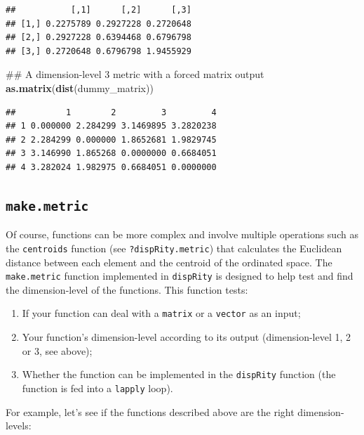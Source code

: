\documentclass[]{book}
\newenvironment{Shaded}{\begin{snugshade}}{\end{snugshade}}
\newcommand{\KeywordTok}[1]{\textcolor[rgb]{0.13,0.29,0.53}{\textbf{#1}}}
\newcommand{\NormalTok}[1]{#1}
\providecommand{\tightlist}{%
  \setlength{\itemsep}{0pt}\setlength{\parskip}{0pt}}
\theoremstyle{definition}
\theoremstyle{definition}
\theoremstyle{definition}
\theoremstyle{remark}
\begin{document}
\begin{verbatim}
##           [,1]      [,2]      [,3]
## [1,] 0.2275789 0.2927228 0.2720648
## [2,] 0.2927228 0.6394468 0.6796798
## [3,] 0.2720648 0.6796798 1.9455929
\end{verbatim}

\begin{Shaded}
\begin{Highlighting}[]
\NormalTok{## A dimension-level 3 metric with a forced matrix output}
\KeywordTok{as.matrix}\NormalTok{(}\KeywordTok{dist}\NormalTok{(dummy_matrix))}
\end{Highlighting}
\end{Shaded}

\begin{verbatim}
##          1        2         3         4
## 1 0.000000 2.284299 3.1469895 3.2820238
## 2 2.284299 0.000000 1.8652681 1.9829745
## 3 3.146990 1.865268 0.0000000 0.6684051
## 4 3.282024 1.982975 0.6684051 0.0000000
\end{verbatim}

\subsection{\texorpdfstring{\texttt{make.metric}}{make.metric}}\label{make.metric}

Of course, functions can be more complex and involve multiple operations
such as the \texttt{centroids} function (see \texttt{?dispRity.metric})
that calculates the Euclidean distance between each element and the
centroid of the ordinated space. The \texttt{make.metric} function
implemented in \texttt{dispRity} is designed to help test and find the
dimension-level of the functions. This function tests:

\begin{enumerate}
\def\labelenumi{\arabic{enumi}.}
\tightlist
\item
  If your function can deal with a \texttt{matrix} or a \texttt{vector}
  as an input;
\item
  Your function's dimension-level according to its output
  (dimension-level 1, 2 or 3, see above);
\item
  Whether the function can be implemented in the \texttt{dispRity}
  function (the function is fed into a \texttt{lapply} loop).
\end{enumerate}

For example, let's see if the functions described above are the right
dimension-levels:
\end{document}
